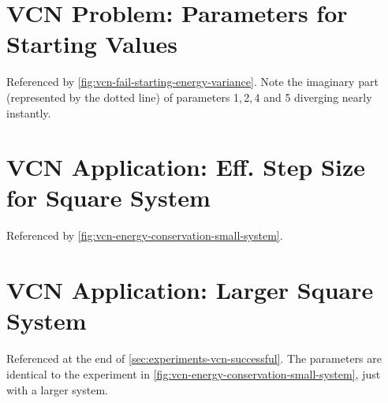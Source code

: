 \begin{minipage}{\textwidth}
    \section{VCN Problem: Parameters for Starting Values}
        \label{appendix:vcn-fail-starting-parameters}
        Referenced by \autoref{fig:vcn-fail-starting-energy-variance}. Note the imaginary part (represented by the dotted line) of parameters 1,\,2,\,4 and 5 diverging nearly instantly.\\
        \vbox{
        }
\end{minipage}

\begin{minipage}{\textwidth}
    \section{VCN Application: Eff. Step Size for Square System}
        \label{appendix:vcn-success-small}
        Referenced by \autoref{fig:vcn-energy-conservation-small-system}.\\
        \vbox{
        }
\end{minipage}

\begin{minipage}{\textwidth}
    \section{VCN Application: Larger Square System}
        \label{appendix:vcn-success-big}
        Referenced at the end of \autoref{sec:experiments-vcn-successful}. The parameters are identical to the experiment in \autoref{fig:vcn-energy-conservation-small-system}, just with a larger system.\\
        \vbox{
        }
\end{minipage}
\newpage
\begin{minipage}{\textwidth}
    \vbox{
    }
\end{minipage}

